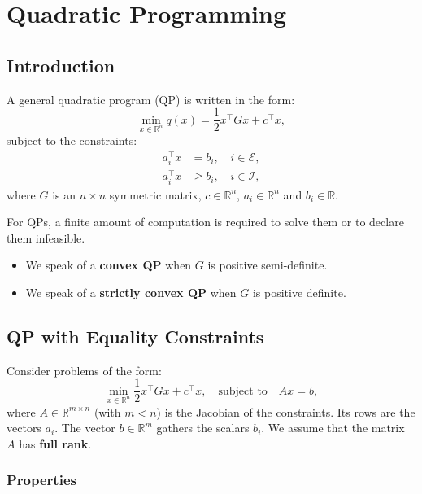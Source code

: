 \chapter{Quadratic Programming}
\label{chap:quadratic-programming}

\section{Introduction}

A general quadratic program (QP) is written in the form:
\begin{equation}
    \min_{x \in \mathbb{R}^n} q(x) = \frac{1}{2} x^\top G x + c^\top x,
\end{equation}
subject to the constraints:
\begin{align}
    a_i^\top x &= b_i, \quad i \in \mathcal{E}, \\
    a_i^\top x &\geq b_i, \quad i \in \mathcal{I},
\end{align}
where $G$ is an $n \times n$ symmetric matrix, $c \in \mathbb{R}^n$, $a_i \in \mathbb{R}^n$ and $b_i \in \mathbb{R}$.

\begin{remarque}
    For QPs, a finite amount of computation is required to solve them or to declare them infeasible.
    \begin{itemize}
        \item We speak of a \textbf{convex QP} when $G$ is positive semi-definite.
        \item We speak of a \textbf{strictly convex QP} when $G$ is positive definite.
    \end{itemize}
\end{remarque}

\section{QP with Equality Constraints}

Consider problems of the form:
\begin{equation}
    \min_{x \in \mathbb{R}^n} \frac{1}{2} x^\top G x + c^\top x, \quad \text{subject to} \quad Ax = b,
\end{equation}
where $A \in \mathbb{R}^{m \times n}$ (with $m < n$) is the Jacobian of the constraints. Its rows are the vectors $a_i$. The vector $b \in \mathbb{R}^m$ gathers the scalars $b_i$.
We assume that the matrix $A$ has \textbf{full rank}.

\subsection{Properties}

